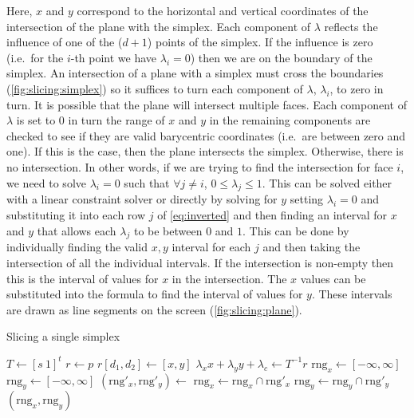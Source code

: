 Here, $x$ and $y$ correspond to the horizontal and vertical coordinates of the
intersection of the plane with the simplex. Each component of $\lambda$
reflects the influence of one of the ($d+1$) points of the simplex. If the
influence is zero (i.e.\ for the $i$-th point we have $\lambda_i=0$) then we are on
the boundary of the simplex.  An intersection of a plane with a
simplex must cross the boundaries
(\autoref{fig:slicing:simplex}) so it suffices to turn each
component of $\lambda$, $\lambda_i$, to zero in turn.  It is possible that the plane will
intersect multiple faces. Each component of $\lambda$ is set to $0$ in turn
the range of $x$ and $y$ in the remaining components are checked
to see if they are valid
barycentric coordinates (i.e.\ are between zero and one).  If this is the case,
then the plane intersects the simplex.  Otherwise, there is no intersection. In
other words, if we are trying to find the intersection for face $i$, we need to
solve $\lambda_i = 0$ such that $\forall j \ne i$, $0 \le \lambda_j \le 1$.
This can be solved either with a linear constraint solver or directly by
solving for $y$ setting $\lambda_i = 0$ and substituting it into each row $j$ of \autoref{eq:inverted}
and then finding an interval for $x$ and $y$ that allows each
$\lambda_j$ to be between $0$ and $1$.  This can be done by individually finding
the valid $x, y$ interval for each $j$ and then taking the intersection of all the
individual intervals. If the intersection is non-empty then this is the interval
of values for $x$ in the intersection. The $x$ values can be substituted into
the formula to find the
interval of values for $y$. These intervals are drawn as line segments
on the screen (\autoref{fig:slicing:plane}). 

\begin{algorithm}
  \caption{Slicing a single simplex}
  \label{alg:slicing:single}
  \begin{algorithmic}
      \State $T\gets \left[ s\ 1 \right]^t$ 
      \State $r \gets p$
      \State $r[d_1,d_2] \gets [x,y]$
      \State $\lambda_x x + \lambda_y y + \lambda_c \gets T^{-1} r$ 
      \State $\textrm{rng}_x \gets [-\infty,\infty]$
      \State $\textrm{rng}_y \gets [-\infty,\infty]$
       
        \State $(\textrm{rng}'_x,\textrm{rng}'_y) \gets$ 
        \State $\textrm{rng}_x \gets \textrm{rng}_x \cap \textrm{rng}'_x$
        \State $\textrm{rng}_y \gets \textrm{rng}_y \cap \textrm{rng}'_y$
      \EndFor
      \State \Return $\left( \textrm{rng}_x, \textrm{rng}_y \right)$
    \EndFunction
  \end{algorithmic}
\end{algorithm}


